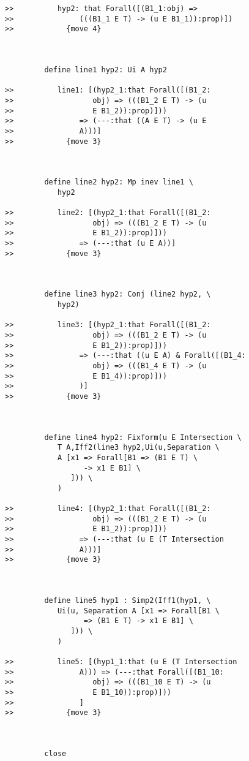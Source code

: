 \documentclass[12pt]{article}
\begin{document}
\begin{verbatim}
>>          hyp2: that Forall([(B1_1:obj) =>
>>               (((B1_1 E T) -> (u E B1_1)):prop)])
>>            {move 4}



         define line1 hyp2: Ui A hyp2

>>          line1: [(hyp2_1:that Forall([(B1_2:
>>                  obj) => (((B1_2 E T) -> (u
>>                  E B1_2)):prop)]))
>>               => (---:that ((A E T) -> (u E
>>               A)))]
>>            {move 3}



         define line2 hyp2: Mp inev line1 \
            hyp2

>>          line2: [(hyp2_1:that Forall([(B1_2:
>>                  obj) => (((B1_2 E T) -> (u
>>                  E B1_2)):prop)]))
>>               => (---:that (u E A))]
>>            {move 3}



         define line3 hyp2: Conj (line2 hyp2, \
            hyp2)

>>          line3: [(hyp2_1:that Forall([(B1_2:
>>                  obj) => (((B1_2 E T) -> (u
>>                  E B1_2)):prop)]))
>>               => (---:that ((u E A) & Forall([(B1_4:
>>                  obj) => (((B1_4 E T) -> (u
>>                  E B1_4)):prop)]))
>>               )]
>>            {move 3}



         define line4 hyp2: Fixform(u E Intersection \
            T A,Iff2(line3 hyp2,Ui(u,Separation \
            A [x1 => Forall[B1 => (B1 E T) \
                  -> x1 E B1] \
               ])) \
            )

>>          line4: [(hyp2_1:that Forall([(B1_2:
>>                  obj) => (((B1_2 E T) -> (u
>>                  E B1_2)):prop)]))
>>               => (---:that (u E (T Intersection
>>               A)))]
>>            {move 3}



         define line5 hyp1 : Simp2(Iff1(hyp1, \
            Ui(u, Separation A [x1 => Forall[B1 \
                  => (B1 E T) -> x1 E B1] \
               ])) \
            )

>>          line5: [(hyp1_1:that (u E (T Intersection
>>               A))) => (---:that Forall([(B1_10:
>>                  obj) => (((B1_10 E T) -> (u
>>                  E B1_10)):prop)]))
>>               ]
>>            {move 3}



         close


\end{verbatim}
\end{document}
